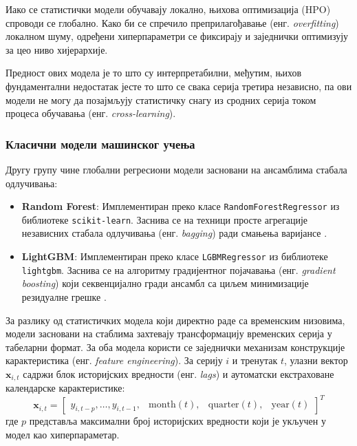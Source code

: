 \documentclass[12pt,oneside]{memoir}
\begin{document}
Иако се статистички модели обучавају локално, њихова оптимизација (HPO) спроводи се глобално. Како би се спречило преприлагођавање (енг. \textit{overfitting}) локалном шуму, одређени хиперпараметри се фиксирају и заједнички оптимизују за цео ниво хијерархије.

Предност ових модела је то што су  интерпретабилни, међутим, њихов фундаментални недостатак јесте то што се свака серија третира независно, па ови модели не могу да позајмљују статистичку снагу из сродних серија током процеса обучавања (енг. \textit{cross-learning}). 

\subsubsection{Класични модели машинског учења}

Другу групу чине глобални регресиони модели засновани на ансамблима стабала одлучивања:

\begin{itemize}
    \item \textbf{Random Forest}: Имплементиран преко класе \texttt{RandomForestRegressor} из библиотеке \texttt{scikit-learn}. Заснива се на техници просте агрегације независних стабала одлучивања (енг. \textit{bagging}) ради смањења варијансе \cite{breiman2001random}.
    
    \item \textbf{LightGBM}: Имплементиран преко класе \texttt{LGBMRegressor} из библиотеке \texttt{lightgbm}. Заснива се на алгоритму градијентног појачавања (енг. \textit{gradient boosting}) који секвенцијално гради ансамбл са циљем минимизације резидуалне грешке  \cite{ke2017lightgbm}.
\end{itemize}

За разлику од статистичких модела који директно раде са временским низовима, модели засновани на стаблима захтевају трансформацију временских серија у табеларни формат. За оба модела користи се заједнички механизам конструкције карактеристика (енг. \textit{feature engineering}). За серију $i$ и тренутак $t$, улазни вектор $\mathbf{x}_{i,t}$ садржи блок историјских вредности (енг. \textit{lags}) и аутоматски екстраховане календарске карактеристике:
\begin{equation}
    \mathbf{x}_{i,t} = 
    \begin{bmatrix}
        y_{i,t-p}, \dots, y_{i,t-1}, & \mathrm{month}(t), & \mathrm{quarter}(t), & \mathrm{year}(t)
    \end{bmatrix}^T
\end{equation}
где $p$ представља максимални број историјских вредности који је укључен у модел као хиперпараметар.
\end{document}
